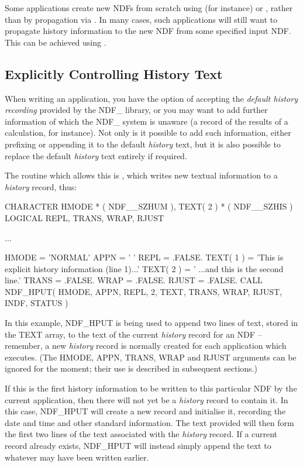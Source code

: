 \documentclass[twoside,11pt,nolof]{starlink}
\providecommand{\st}[1]{{\emph{#1}}}
\begin{document}
Some applications create new NDFs from scratch using (for instance)
 or , rather
than by propagation via . In many cases,
such applications will still want to propagate history information to the
new NDF from some specified input NDF. This can be achieved using
.

\subsection{\label{ss:controllinghistory}Explicitly Controlling History Text}

When writing an application, you have the option of accepting the
\st{default history recording\/} provided by the NDF\_ library, or you may
want to add further information of which the NDF\_ system is unaware
(a record of the results of a calculation, for instance).  Not only is
it possible to add such information, either prefixing or appending it
to the default \st{history\/} text, but it is also possible to replace the
default \st{history\/} text entirely if required.

The routine which allows this is , which writes new textual
information to a \st{history\/} record, thus:

\small
\begin{terminalv}
      CHARACTER HMODE * ( NDF__SZHUM ), TEXT( 2 ) * ( NDF__SZHIS )
      LOGICAL REPL, TRANS, WRAP, RJUST

      ...

      HMODE = 'NORMAL'
      APPN = ' '
      REPL = .FALSE.
      TEXT( 1 ) = 'This is explicit history information (line 1)...'
      TEXT( 2 ) = '   ...and this is the second line.'
      TRANS = .FALSE.
      WRAP = .FALSE.
      RJUST = .FALSE.
      CALL NDF_HPUT( HMODE, APPN, REPL, 2, TEXT, TRANS, WRAP, RJUST, INDF,
                     STATUS )
\end{terminalv}
\normalsize

In this example, NDF\_HPUT is being used to append two lines of text,
stored in the TEXT array, to the text of the current \st{history\/}
record for an NDF -- remember, a new \st{history\/} record is normally
created for each application which executes. (The HMODE, APPN, TRANS,
WRAP and RJUST arguments can be ignored for the moment; their use is
described in subsequent sections.)

If this is the first history information to be written to this
particular NDF by the current application, then there will not yet be
a \st{history\/} record to contain it. In this case, NDF\_HPUT will create a
new record and initialise it, recording the date and time and other
standard information. The text provided will then form the first two
lines of the text associated with the \st{history\/} record. If a current
record already exists, NDF\_HPUT will instead simply append the text
to whatever may have been written earlier.
\end{document}
